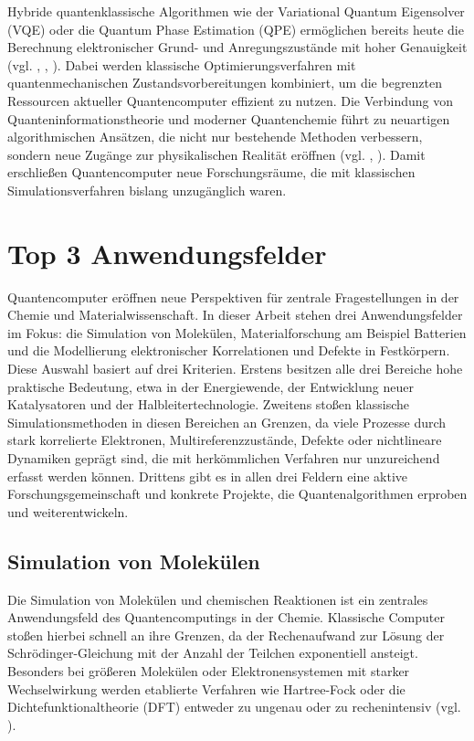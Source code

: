 {Hybride quantenklassische Algorithmen wie der Variational Quantum Eigensolver (VQE) oder die Quantum Phase Estimation (QPE) ermöglichen bereits heute die Berechnung elektronischer Grund- und Anregungszustände mit hoher Genauigkeit (vgl. \cite{aspuru-guzik_simulated_2005}, \cite{weidman_quantum_2024}, \cite{cao_quantum_2019}). Dabei werden klassische Optimierungsverfahren mit quantenmechanischen Zustandsvorbereitungen kombiniert, um die begrenzten Ressourcen aktueller Quantencomputer effizient zu nutzen.\newline\newline
Die Verbindung von Quanteninformationstheorie und moderner Quantenchemie führt zu neuartigen algorithmischen Ansätzen, die nicht nur bestehende Methoden verbessern, sondern neue Zugänge zur physikalischen Realität eröffnen (vgl. \cite{liu_quantum_2020}, \cite{weidman_quantum_2024}). Damit erschließen Quantencomputer neue Forschungsräume, die mit klassischen Simulationsverfahren bislang unzugänglich waren.}


\section{Top 3 Anwendungsfelder}
{Quantencomputer eröffnen neue Perspektiven für zentrale Fragestellungen in der Chemie und Materialwissenschaft. In dieser Arbeit stehen drei Anwendungsfelder im Fokus: die Simulation von Molekülen, Materialforschung am Beispiel Batterien und die Modellierung elektronischer Korrelationen und Defekte in Festkörpern.
Diese Auswahl basiert auf drei Kriterien. Erstens besitzen alle drei Bereiche hohe praktische Bedeutung, etwa in der Energiewende, der Entwicklung neuer Katalysatoren und der Halbleitertechnologie. Zweitens stoßen klassische Simulationsmethoden in diesen Bereichen an Grenzen, da viele Prozesse durch stark korrelierte Elektronen, Multireferenzzustände, Defekte oder nichtlineare Dynamiken geprägt sind, die mit herkömmlichen Verfahren nur unzureichend erfasst werden können. Drittens gibt es in allen drei Feldern eine aktive Forschungsgemeinschaft und konkrete Projekte, die Quantenalgorithmen erproben und weiterentwickeln.}

\subsection{Simulation von Molekülen}
{Die Simulation von Molekülen und chemischen Reaktionen ist ein zentrales Anwendungsfeld des Quantencomputings in der Chemie. Klassische Computer stoßen hierbei schnell an ihre Grenzen, da der Rechenaufwand zur Lösung der Schrödinger-Gleichung mit der Anzahl der Teilchen exponentiell ansteigt. Besonders bei größeren Molekülen oder Elektronensystemen mit starker Wechselwirkung werden etablierte Verfahren wie Hartree-Fock oder die Dichtefunktionaltheorie (DFT) entweder zu ungenau oder zu rechenintensiv (vgl. \cite{bauer_quantum_2020}).}

